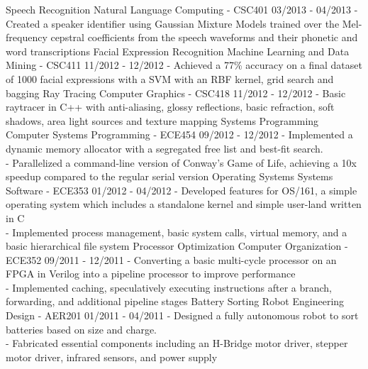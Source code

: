 \documentclass[]{friggeri-cv}
\begin{document}
\begin{entrylist}
  \entry
    {Speech Recognition}
    {Natural Language Computing - CSC401}
    {03/2013 - 04/2013}
    {- Created a speaker identifier using Gaussian Mixture Models trained over the Mel-frequency cepstral coefficients from the speech waveforms  and their phonetic and word transcriptions}
  \entry
    {Facial Expression Recognition}
    {Machine Learning and Data Mining - CSC411}
    {11/2012 - 12/2012}
    {- Achieved a 77\% accuracy on a final dataset of 1000 facial expressions with a SVM with an RBF kernel, grid search and bagging}
  \entry
    {Ray Tracing}
    {Computer Graphics - CSC418}
    {11/2012 - 12/2012}
    {- Basic raytracer in C++ with anti-aliasing, glossy reflections, basic refraction, soft shadows, area light sources and texture mapping}
  \entry
    {Systems Programming}
    {Computer Systems Programming - ECE454}
    {09/2012 - 12/2012}
    {- Implemented a dynamic memory allocator with a segregated free list and best-fit search.\\
    - Parallelized a command-line version of Conway’s Game of Life, achieving a 10x speedup compared to the regular serial version}
  \entry
    {Operating Systems}
    {Systems Software - ECE353}
    {01/2012 - 04/2012}
    {- Developed  features  for OS/161, a simple operating  system  which includes a standalone kernel and simple user-land  written in C\\
    - Implemented process management, basic system  calls, virtual memory, and a basic hierarchical file system}
  \entry
    {Processor Optimization}
    {Computer Organization - ECE352}
    {09/2011 - 12/2011}
    {- Converting a basic multi-cycle processor on an FPGA in Verilog into a pipeline processor to improve performance\\
    - Implemented caching, speculatively executing instructions after a branch, forwarding, and additional pipeline stages}
  \entry
    {Battery Sorting Robot}
    {Engineering Design - AER201}
    {01/2011 - 04/2011}
    {- Designed a fully autonomous robot to sort batteries based on size and charge.\\
    - Fabricated  essential components including an H-Bridge motor driver, stepper motor driver, infrared sensors, and power supply}
\end{entrylist}
\end{document}
